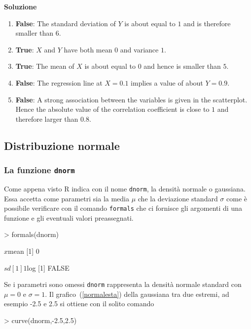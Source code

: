 \documentclass[onecolumn,12pt]{book}
\newenvironment{solution}{\textbf{Soluzione}\newline}{}
\newenvironment{answerlist}{\renewcommand{\labelenumi}{(\alph{enumi})}\begin{enumerate}}{\end{enumerate}}
\begin{document}
\begin{itemize}
\begin{solution}
\begin{answerlist}
  \item \textbf{False}: The standard deviation of $Y$ is about equal to $ 1 $ and is therefore smaller than $6$.
  \item \textbf{True}: $X$ and $Y$ have both mean $0$ and variance $1$.
  \item \textbf{True}: The mean of $X$ is about equal to $ 0 $ and hence is smaller than $5$.
  \item \textbf{False}: The regression line at $X=0.1$ implies a value of about $Y = 0.9$.
  \item \textbf{False}: A strong association between the variables is given in the scatterplot. Hence the absolute value of the correlation coefficient is close to $1$ and therefore larger than $0.8$.
\end{answerlist}
\end{solution}
\end{itemize}


\subsection{Distribuzione normale}
\subsubsection{La funzione \texttt{dnorm}}
Come appena visto \textsf{R }indica con il nome \texttt{dnorm}, la densit\`a normale o gaussiana. Essa accetta come parametri sia la media $\mu$ che la deviazione standard $\sigma$ come \`e possibile verificare con il comando \texttt{formals} che ci fornisce gli argomenti di una funzione e gli eventuali valori preassegnati.
\begin{Schunk}
\begin{Sinput}
> formals(dnorm)
\end{Sinput}
\begin{Soutput}
$x


$mean
[1] 0

$sd
[1] 1

$log
[1] FALSE
\end{Soutput}
\end{Schunk}
Se i parametri sono omessi \texttt{dnorm} rappresenta la densit\`a normale standard con $\mu=0$ e $\sigma=1$.
Il grafico~(\ref{normalesta}) della gaussiana
 tra due estremi, ad esempio -2.5 e 2.5 si ottiene con il solito comando
\begin{Schunk}
\begin{Sinput}
> curve(dnorm,-2.5,2.5)
\end{Sinput}
\end{Schunk}
\end{document}
